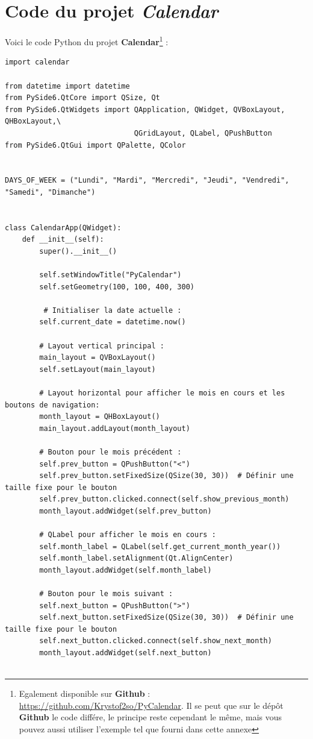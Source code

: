 \chapter{Code du projet \textit{Calendar}}\label{code_calendar}

Voici le code Python du projet \textbf{Calendar}\footnote{Egalement disponible sur \textbf{Github} : \url{https://github.com/Krystof2so/PyCalendar}. Il se peut que sur le dépôt \textbf{Github} le code différe, le principe reste cependant le même, mais vous pouvez aussi utiliser l'exemple tel que fourni dans cette annexe} :

\begin{lstlisting}[style=python]
import calendar

from datetime import datetime
from PySide6.QtCore import QSize, Qt
from PySide6.QtWidgets import QApplication, QWidget, QVBoxLayout, QHBoxLayout,\
                              QGridLayout, QLabel, QPushButton
from PySide6.QtGui import QPalette, QColor


DAYS_OF_WEEK = ("Lundi", "Mardi", "Mercredi", "Jeudi", "Vendredi", "Samedi", "Dimanche")


class CalendarApp(QWidget):   
    def __init__(self):
        super().__init__()

        self.setWindowTitle("PyCalendar")
        self.setGeometry(100, 100, 400, 300)

         # Initialiser la date actuelle :
        self.current_date = datetime.now()

        # Layout vertical principal :
        main_layout = QVBoxLayout()
        self.setLayout(main_layout)

        # Layout horizontal pour afficher le mois en cours et les boutons de navigation:
        month_layout = QHBoxLayout()
        main_layout.addLayout(month_layout)

        # Bouton pour le mois précédent :
        self.prev_button = QPushButton("<")
        self.prev_button.setFixedSize(QSize(30, 30))  # Définir une taille fixe pour le bouton
        self.prev_button.clicked.connect(self.show_previous_month)
        month_layout.addWidget(self.prev_button)

        # QLabel pour afficher le mois en cours :
        self.month_label = QLabel(self.get_current_month_year())
        self.month_label.setAlignment(Qt.AlignCenter)
        month_layout.addWidget(self.month_label)

        # Bouton pour le mois suivant :
        self.next_button = QPushButton(">")
        self.next_button.setFixedSize(QSize(30, 30))  # Définir une taille fixe pour le bouton
        self.next_button.clicked.connect(self.show_next_month)
        month_layout.addWidget(self.next_button)


\end{lstlisting}
